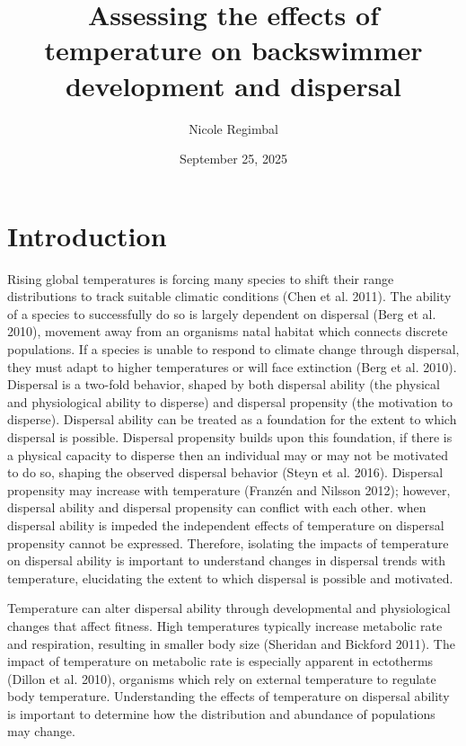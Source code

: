 \documentclass[
]{article}
\title{Assessing the effects of temperature on backswimmer development
and dispersal}
\author{Nicole Regimbal}
\date{September 25, 2025}
\begin{document}
\maketitle

\section{Introduction}\label{introduction}

Rising global temperatures is forcing many species to shift their range
distributions to track suitable climatic conditions (Chen et al. 2011).
The ability of a species to successfully do so is largely dependent on
dispersal (Berg et al. 2010), movement away from an organisms natal
habitat which connects discrete populations. If a species is unable to
respond to climate change through dispersal, they must adapt to higher
temperatures or will face extinction (Berg et al. 2010). Dispersal is a
two-fold behavior, shaped by both dispersal ability (the physical and
physiological ability to disperse) and dispersal propensity (the
motivation to disperse). Dispersal ability can be treated as a
foundation for the extent to which dispersal is possible. Dispersal
propensity builds upon this foundation, if there is a physical capacity
to disperse then an individual may or may not be motivated to do so,
shaping the observed dispersal behavior (Steyn et al. 2016). Dispersal
propensity may increase with temperature (Franzén and Nilsson 2012);
however, dispersal ability and dispersal propensity can conflict with
each other. when dispersal ability is impeded the independent effects of
temperature on dispersal propensity cannot be expressed. Therefore,
isolating the impacts of temperature on dispersal ability is important
to understand changes in dispersal trends with temperature, elucidating
the extent to which dispersal is possible and motivated.

Temperature can alter dispersal ability through developmental and
physiological changes that affect fitness. High temperatures typically
increase metabolic rate and respiration, resulting in smaller body size
(Sheridan and Bickford 2011). The impact of temperature on metabolic
rate is especially apparent in ectotherms (Dillon et al. 2010),
organisms which rely on external temperature to regulate body
temperature. Understanding the effects of temperature on dispersal
ability is important to determine how the distribution and abundance of
populations may change.
\end{document}
